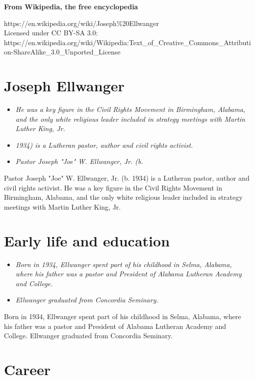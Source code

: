\textbf{From Wikipedia, the free encyclopedia}

https://en.wikipedia.org/wiki/Joseph\%20Ellwanger\\
Licensed under CC BY-SA 3.0:\\
https://en.wikipedia.org/wiki/Wikipedia:Text\_of\_Creative\_Commons\_Attribution-ShareAlike\_3.0\_Unported\_License

\section{Joseph Ellwanger}\label{joseph-ellwanger}

\begin{itemize}
\item
  \emph{He was a key figure in the Civil Rights Movement in Birmingham,
  Alabama, and the only white religious leader included in strategy
  meetings with Martin Luther King, Jr.}
\item
  \emph{1934) is a Lutheran pastor, author and civil rights activist.}
\item
  \emph{Pastor Joseph "Joe" W. Ellwanger, Jr. (b.}
\end{itemize}

Pastor Joseph "Joe" W. Ellwanger, Jr. (b. 1934) is a Lutheran pastor,
author and civil rights activist. He was a key figure in the Civil
Rights Movement in Birmingham, Alabama, and the only white religious
leader included in strategy meetings with Martin Luther King, Jr.

\section{Early life and education}\label{early-life-and-education}

\begin{itemize}
\item
  \emph{Born in 1934, Ellwanger spent part of his childhood in Selma,
  Alabama, where his father was a pastor and President of Alabama
  Lutheran Academy and College.}
\item
  \emph{Ellwanger graduated from Concordia Seminary.}
\end{itemize}

Born in 1934, Ellwanger spent part of his childhood in Selma, Alabama,
where his father was a pastor and President of Alabama Lutheran Academy
and College. Ellwanger graduated from Concordia Seminary.

\section{Career}\label{career}

